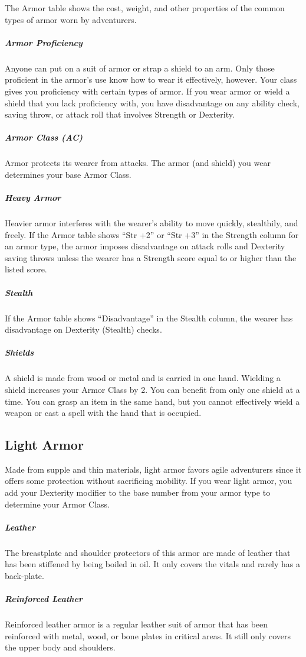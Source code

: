 The Armor table shows the cost, weight, and other properties of the common types of armor worn by adventurers.

\subparagraph*{Armor Proficiency} Anyone can put on a suit of armor or strap a shield to an arm. Only those proficient in the armor's use know how to wear it effectively, however. Your class gives you proficiency with certain types of armor. If you wear armor or wield a shield that you lack proficiency with, you have disadvantage on any ability check, saving throw, or attack roll that involves Strength or Dexterity.

\subparagraph*{Armor Class (AC)} Armor protects its wearer from attacks. The armor (and shield) you wear determines your base Armor Class.

\subparagraph*{Heavy Armor} Heavier armor interferes with the wearer's ability to move quickly, stealthily, and freely. If the Armor table shows “Str +2” or “Str +3” in the Strength column for an armor type, the armor imposes disadvantage on attack rolls and Dexterity saving throws unless the wearer has a Strength score equal to or higher than the listed score.

\subparagraph*{Stealth} If the Armor table shows “Disadvantage” in the Stealth column, the wearer has disadvantage on Dexterity (Stealth) checks.

\subparagraph*{Shields} A shield is made from wood or metal and is carried in one hand. Wielding a shield increases your Armor Class by 2. You can benefit from only one shield at a time. You can grasp an item in the same hand, but you cannot effectively wield a weapon or cast a spell with the hand that is occupied.

\subsection{Light Armor}

Made from supple and thin materials, light armor favors agile adventurers since it offers some protection without sacrificing mobility. If you wear light armor, you add your Dexterity modifier to the base number from your armor type to determine your Armor Class.

\subparagraph*{Leather} The breastplate and shoulder protectors of this armor are made of leather that has been stiffened by being boiled in oil. It only covers the vitals and rarely has a back-plate.

\subparagraph*{Reinforced Leather} Reinforced leather armor is a regular leather suit of armor that has been reinforced with metal, wood, or bone plates in critical areas. It still only covers the upper body and shoulders.

